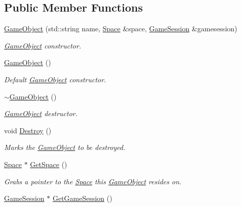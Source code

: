 \subsection*{Public Member Functions}
\begin{DoxyCompactItemize}
\item 
\hyperlink{classDCEngine_1_1GameObject_aade54d989806df1add8dc744841b495d}{Game\-Object} (std\-::string name, \hyperlink{classDCEngine_1_1Space}{Space} \&space, \hyperlink{classDCEngine_1_1GameSession}{Game\-Session} \&gamesession)
\begin{DoxyCompactList}\small\item\em \hyperlink{classDCEngine_1_1GameObject}{Game\-Object} constructor. \end{DoxyCompactList}\item 
\hyperlink{classDCEngine_1_1GameObject_ab4e9139765017f41b461033bdb76dad0}{Game\-Object} ()
\begin{DoxyCompactList}\small\item\em Default \hyperlink{classDCEngine_1_1GameObject}{Game\-Object} constructor. \end{DoxyCompactList}\item 
\hyperlink{classDCEngine_1_1GameObject_a6adc0ce3ed11ea55f6e562299932eab8}{$\sim$\-Game\-Object} ()
\begin{DoxyCompactList}\small\item\em \hyperlink{classDCEngine_1_1GameObject}{Game\-Object} destructor. \end{DoxyCompactList}\item 
\hypertarget{classDCEngine_1_1GameObject_ad87573ab7f84e3af0678e3e01904a105}{void \hyperlink{classDCEngine_1_1GameObject_ad87573ab7f84e3af0678e3e01904a105}{Destroy} ()}\label{classDCEngine_1_1GameObject_ad87573ab7f84e3af0678e3e01904a105}

\begin{DoxyCompactList}\small\item\em Marks the \hyperlink{classDCEngine_1_1GameObject}{Game\-Object} to be destroyed. \end{DoxyCompactList}\item 
\hypertarget{classDCEngine_1_1GameObject_a7e952fe2f1df80d8fa7a967005e91e48}{\hyperlink{classDCEngine_1_1Space}{Space} $\ast$ \hyperlink{classDCEngine_1_1GameObject_a7e952fe2f1df80d8fa7a967005e91e48}{Get\-Space} ()}\label{classDCEngine_1_1GameObject_a7e952fe2f1df80d8fa7a967005e91e48}

\begin{DoxyCompactList}\small\item\em Grabs a pointer to the \hyperlink{classDCEngine_1_1Space}{Space} this \hyperlink{classDCEngine_1_1GameObject}{Game\-Object} resides on. \end{DoxyCompactList}\item 
\hypertarget{classDCEngine_1_1GameObject_a857ecbb16eb7fcbe66e09aa0f197e83b}{\hyperlink{classDCEngine_1_1GameSession}{Game\-Session} $\ast$ \hyperlink{classDCEngine_1_1GameObject_a857ecbb16eb7fcbe66e09aa0f197e83b}{Get\-Game\-Session} ()}\label{classDCEngine_1_1GameObject_a857ecbb16eb7fcbe66e09aa0f197e83b}


\end{DoxyCompactItemize}
